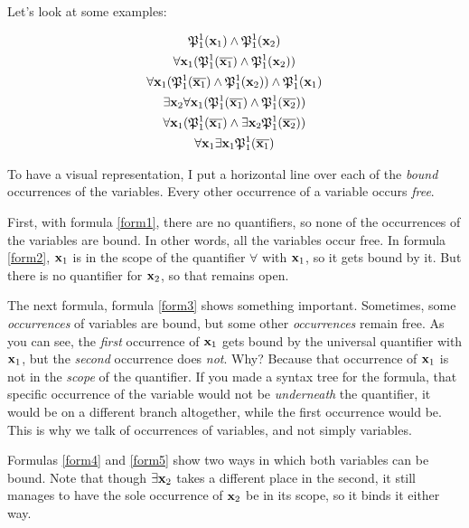 Let's look at some examples:

\begin{gather}
	\mathfrak{P}^{1}_{1}(\mathbf{x}_{1}) \wedge \mathfrak{P}^{1}_{1}(\mathbf{x}_{2})\label{form1}\\
	\forall \mathbf{x}_{1} (\mathfrak{P}^{1}_{1}(\overline{\mathbf{x}_{1}}) \wedge \mathfrak{P}^{1}_{1}(\mathbf{x}_{2}))\label{form2}\\
	\forall \mathbf{x}_{1} (\mathfrak{P}^{1}_{1}(\overline{\mathbf{x}_{1}}) \wedge \mathfrak{P}^{1}_{1}(\mathbf{x}_{2})) \wedge \mathfrak{P}^{1}_{1}(\mathbf{x}_{1})\label{form3}\\
	\exists \mathbf{x}_{2} \forall \mathbf{x}_{1}(\mathfrak{P}^{1}_{1}(\overline{\mathbf{x}_{1}}) \wedge \mathfrak{P}^{1}_{1}(\overline{\mathbf{x}_{2}}))\label{form4}\\
	\forall \mathbf{x}_{1}(\mathfrak{P}^{1}_{1}(\overline{\mathbf{x}_{1}}) \wedge \exists \mathbf{x}_{2} \mathfrak{P}^{1}_{1}(\overline{\mathbf{x}_{2}}))\label{form5}\\
	\forall \mathbf{x}_{1} \exists \mathbf{x}_{1} \mathfrak{P}^{1}_{1}(\overline{\mathbf{x}_{1}}) \label{form6}
	\end{gather}

To have a visual representation, I put a horizontal line over each of the \textit{bound} occurrences of the variables. Every other occurrence of a variable occurs \textit{free}.

First, with formula \ref{form1}, there are no quantifiers, so none of the occurrences of the variables are bound. In other words, all the variables occur free. In formula \ref{form2}, $\mathbf{x}_{1}$ is in the scope of the quantifier $\forall$ with $\mathbf{x}_{1}$, so it gets bound by it. But there is no quantifier for $\mathbf{x}_{2}$, so that remains open. 

The next formula, formula \ref{form3} shows something important. Sometimes, some \textit{occurrences} of variables are bound, but some other \textit{occurrences} remain free. As you can see, the \textit{first} occurrence of $\mathbf{x}_{1}$ gets bound by the universal quantifier with $\mathbf{x}_{1}$, but the \textit{second} occurrence does \textit{not}. Why? Because that occurrence of $\mathbf{x}_{1}$ is not in the \textit{scope} of the quantifier. If you made a syntax tree for the formula, that specific occurrence of the variable would not be \textit{underneath} the quantifier, it would be on a different branch altogether, while the first occurrence would be. This is why we talk of occurrences of variables, and not simply variables. 

Formulas \ref{form4} and \ref{form5} show two ways in which both variables can be bound. Note that though $\exists \mathbf{x}_{2}$ takes a different place in the second, it still manages to have the sole occurrence of $\mathbf{x}_{2}$ be in its scope, so it binds it either way. 

